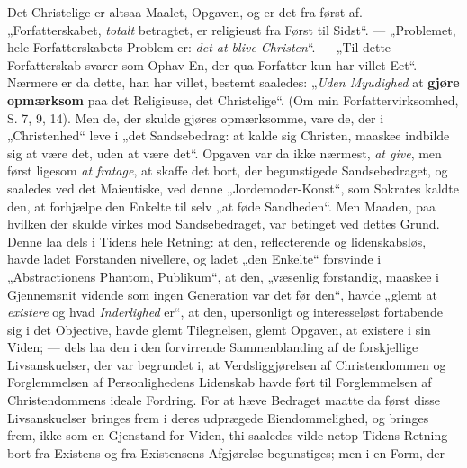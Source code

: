 \documentclass[12pt,a4paper]{book}
\begin{document}
Det Christelige er altsaa Maalet, Opgaven, og er det fra først af.
„Forfatterskabet, \emph{totalt} betragtet, er religieust fra Først til
Sidst“. --- „Problemet, hele Forfatterskabets Problem er: \emph{det at blive
Christen}“. --- „Til dette Forfatterskab svarer som Ophav En, der qua
Forfatter kun har villet Eet“. --- Nærmere er da dette, han har villet,
bestemt saaledes: „\emph{Uden Myudighed} at \textbf{gjøre opmærksom} paa det
Religieuse, det Christelige“.
(Om min Forfattervirksomhed, S. 7, 9, 14). Men de, der skulde gjøres
opmærksomme, vare de, der i „Christenhed“ leve i „det Sandsebedrag: at
kalde sig Christen, maaskee indbilde sig at være det, uden at være det“.
Opgaven var da ikke nærmest, \emph{at give}, men først ligesom \emph{at fratage},
at skaffe det bort, der begunstigede Sandsebedraget, og saaledes ved det
Maieutiske, ved denne „Jordemoder-Konst“, som Sokrates kaldte den, at
forhjælpe den Enkelte til selv „at føde Sandheden“. Men Maaden, paa hvilken
der skulde virkes mod Sandsebedraget, var betinget ved dettes Grund. Denne
laa dels i Tidens hele Retning: at den, reflecterende og lidenskabsløs,
havde ladet Forstanden nivellere, og ladet „den Enkelte“ forsvinde i
„Abstractionens Phantom, Publikum“, at den, „væsenlig forstandig, maaskee i
Gjennemsnit vidende som ingen Generation var det før den“, havde „glemt
at \emph{existere} og hvad \emph{Inderlighed} er“, at den,
upersonligt og interesseløst fortabende sig i det Objective, havde glemt
Tilegnelsen, glemt Opgaven, at existere i sin Viden; --- dels laa den i den
forvirrende Sammenblanding af de forskjellige Livsanskuelser, der var
begrundet i, at Verdsliggjørelsen af Christendommen og Forglemmelsen af
Personlighedens Lidenskab havde ført til Forglemmelsen af Christendommens
ideale Fordring. For at hæve Bedraget maatte da først disse Livsanskuelser
bringes frem i deres udprægede Eiendommelighed, og bringes frem, ikke som en
Gjenstand for Viden, thi saaledes vilde netop Tidens Retning bort fra
Existens og fra Existensens Afgjørelse begunstiges; men i en Form, der
\end{document}
